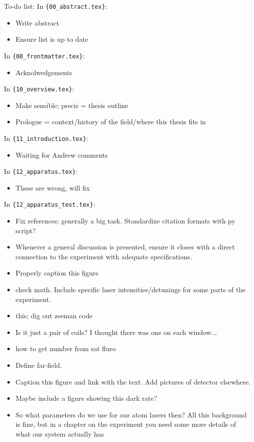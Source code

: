 To-do list:\newline
In \verb|{00_abstract.tex}|:
\begin{itemize}
\item {Write abstract}
\item {Ensure list is up to date}
\end{itemize}
In \verb|{00_frontmatter.tex}|:
\begin{itemize}
\item {Acknolwedgements}
\end{itemize}
In \verb|{10_overview.tex}|:
\begin{itemize}
\item {Make sensible; precis = thesis outline}
\item {Prologue = context/history of the field/where this thesis fits in}
\end{itemize}
In \verb|{11_introduction.tex}|:
\begin{itemize}
\item {Waiting for Andrew comments}
\end{itemize}
In \verb|{12_apparatus.tex}|:
\begin{itemize}
\item {These are wrong, will fix}
\end{itemize}
In \verb|{12_apparatus_test.tex}|:
\begin{itemize}
\item {Fix references; generally a big task. Standardize citation formats with py script?}
\item {Whenever a general discussion is presented, ensure it closes with a direct connection to the experiment with adequate specifications.}
\item {Properly caption this figure}
\item {check math. Include specific laser intensities/detunings for some parts of the experiment.}
\item {this; dig out zeeman code}
\item {Is it just a pair of coils? I thought there was one on each window...}
\item {how to get number from sat fluro}
\item {Define far-field.}
\item {Caption this figure and link with the text. Add pictures of detector elsewhere.}
\item {Maybe include a figure showing this dark rate?}
\item {So what parameters do we use for our atom lasers then?  All this background is fine, but in a chapter on the experiment you need some more details of what our system actually has}
\end{itemize}
